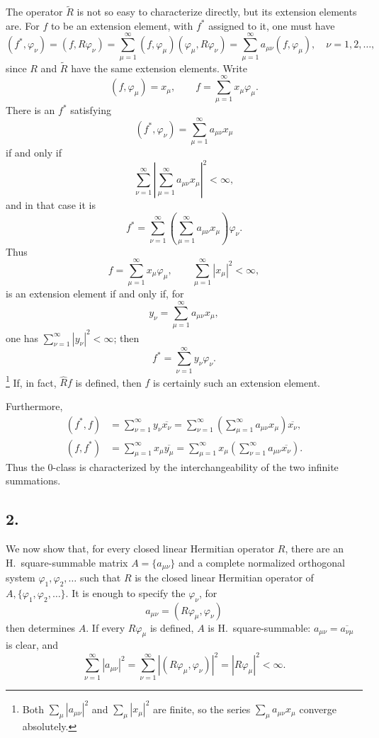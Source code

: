 ﻿\documentclass[paper=b5,fontsize=13pt,bookmarkpackage=false,twoside]{scrartcl}
\begin{document}
The operator \(\widetilde R\) is not so easy to characterize directly,
but its extension elements are.  For \(f\) to be an extension element,
with \(f^*\) assigned to it, one must have
\[
 (f^*,\varphi_\nu)
 =(f,R\varphi_\nu)
 =\sum_{\mu=1}^{\infty}(f,\varphi_\mu)
       (\varphi_\mu,R\varphi_\nu)
 =\sum_{\mu=1}^{\infty}a_{\mu\nu}(f,\varphi_\mu),
 \quad \nu=1,2,\ldots,
\]
since \(R\) and \(\widetilde R\) have the same extension elements.
Write
\[
  (f,\varphi_\mu)=x_\mu,\qquad
  f=\sum_{\mu=1}^{\infty}x_\mu\varphi_\mu.
\]
There is an \(f^*\) satisfying
\[
  (f^*,\varphi_\nu)
  =\sum_{\mu=1}^{\infty}a_{\mu\nu}x_\mu
\]
if and only if
\[
  \sum_{\nu=1}^{\infty}
  \left|\sum_{\mu=1}^{\infty}a_{\mu\nu}x_\mu\right|^2<\infty,
\]
and in that case it is
\[
  f^*=\sum_{\nu=1}^{\infty}
      \left(\sum_{\mu=1}^{\infty}a_{\mu\nu}x_\mu\right)\varphi_\nu.
\]
Thus
\[
  f=\sum_{\mu=1}^{\infty}x_\mu\varphi_\mu,
  \qquad \sum_{\mu=1}^{\infty}|x_\mu|^2<\infty,
\]
is an extension element if and only if, for
\[
  y_\nu=\sum_{\mu=1}^{\infty}a_{\mu\nu}x_\mu,
  \tag{75}\label{eq:appIII-75}
\]
one has \(\sum_{\nu=1}^{\infty}|y_\nu|^2<\infty\); then
\[
  f^*=\sum_{\nu=1}^{\infty}y_\nu\varphi_\nu.
\]
\footnote{\label{fn:75}Both \(\sum_\mu|a_{\mu\nu}|^2\) and
\(\sum_\mu|x_\mu|^2\) are finite, so the series
\(\sum_\mu a_{\mu\nu}x_\mu\) converge absolutely.}
If, in fact, \(\widehat Rf\) is defined, then \(f\) is certainly such
an extension element.

Furthermore,
\begin{align*}
 (f^*,f)
 &=\sum_{\nu=1}^{\infty}y_\nu\overline{x_\nu}
  =\sum_{\nu=1}^{\infty}
      \left(\sum_{\mu=1}^{\infty}a_{\mu\nu}x_\mu\right)
      \overline{x_\nu},\\
 (f,f^*)
 &=\sum_{\mu=1}^{\infty}x_\mu\overline{y_\mu}
  =\sum_{\mu=1}^{\infty}x_\mu
      \left(\sum_{\nu=1}^{\infty}
        a_{\mu\nu}\overline{x_\nu}\right).
\end{align*}
Thus the \(0\)-class is characterized by the interchangeability of the
two infinite summations.

\subsection*{2.}
\label{appIII:2}

We now show that, for every closed linear Hermitian operator \(R\),
there are an H.\ square-summable matrix
\(A=\{a_{\mu\nu}\}\) and a complete normalized orthogonal system
\(\varphi_1,\varphi_2,\ldots\) such that \(R\) is the closed linear
Hermitian operator of \(A,\{\varphi_1,\varphi_2,\ldots\}\).  It is
enough to specify the \(\varphi_\nu\), for
\[
  a_{\mu\nu}=(R\varphi_\mu,\varphi_\nu)
\]
then determines \(A\).  If every \(R\varphi_\mu\) is defined, \(A\) is
H.\ square-summable: \(a_{\mu\nu}=\overline{a_{\nu\mu}}\) is clear, and
\[
  \sum_{\nu=1}^{\infty}|a_{\mu\nu}|^2
  =\sum_{\nu=1}^{\infty}|(R\varphi_\mu,\varphi_\nu)|^2
  =|R\varphi_\mu|^2<\infty.
\]
\end{document}
